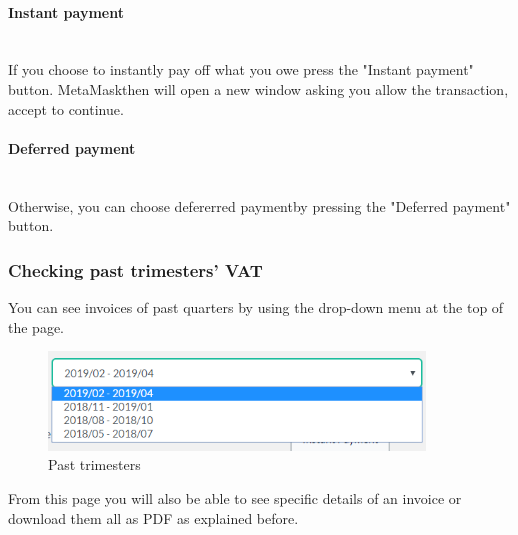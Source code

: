 			\paragraph{Instant payment} \mbox{}\\
			If you choose to instantly pay off what you owe press the "Instant 
			payment" button. MetaMask\glosp then will open a new window asking you allow the 
			transaction, accept to continue.
			\paragraph{Deferred payment} \mbox{}\\
			Otherwise, you can choose defererred payment\glosp by pressing the "Deferred payment" button.
%
		\subsubsection{Checking past trimesters' VAT}
		You can see invoices of past quarters by using the drop-down 
		menu at the top of the page.
		\begin{figure}[H]
			\includegraphics[width=10cm]{res/images/past_trimesters.png}
			\centering
			\caption{Past trimesters}
		\end{figure}
		\noindent From this page you will also be able to see specific details 
		of an invoice or download them all as PDF as explained before.